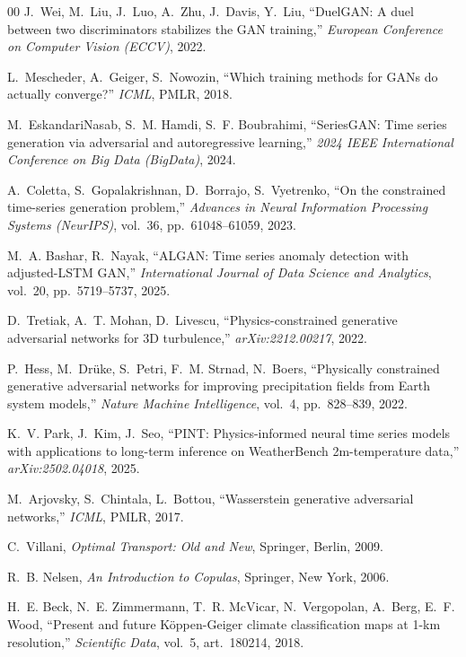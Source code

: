 \documentclass[preprint,12pt]{elsarticle}
\begin{document}
\begin{thebibliography}{00}
J.~Wei, M.~Liu, J.~Luo, A.~Zhu, J.~Davis, Y.~Liu,
``DuelGAN: A duel between two discriminators stabilizes the GAN training,''
\textit{European Conference on Computer Vision (ECCV)}, 2022.

L.~Mescheder, A.~Geiger, S.~Nowozin,
``Which training methods for GANs do actually converge?''
\textit{ICML}, PMLR, 2018.

M.~EskandariNasab, S.~M. Hamdi, S.~F. Boubrahimi,
``SeriesGAN: Time series generation via adversarial and autoregressive learning,''
\textit{2024 IEEE International Conference on Big Data (BigData)}, 2024.

A.~Coletta, S.~Gopalakrishnan, D.~Borrajo, S.~Vyetrenko,
``On the constrained time-series generation problem,''
\textit{Advances in Neural Information Processing Systems (NeurIPS)}, vol.~36, pp.~61048--61059, 2023.

M.~A. Bashar, R.~Nayak,
``ALGAN: Time series anomaly detection with adjusted-LSTM GAN,''
\textit{International Journal of Data Science and Analytics}, vol.~20, pp.~5719--5737, 2025.

D.~Tretiak, A.~T. Mohan, D.~Livescu,
``Physics-constrained generative adversarial networks for 3D turbulence,''
\textit{arXiv:2212.00217}, 2022.

P.~Hess, M.~Dr{\"u}ke, S.~Petri, F.~M. Strnad, N.~Boers,
``Physically constrained generative adversarial networks for improving precipitation fields from Earth system models,''
\textit{Nature Machine Intelligence}, vol.~4, pp.~828--839, 2022.

K.~V. Park, J.~Kim, J.~Seo,
``PINT: Physics-informed neural time series models with applications to long-term inference on WeatherBench 2m-temperature data,''
\textit{arXiv:2502.04018}, 2025.

M.~Arjovsky, S.~Chintala, L.~Bottou,
``Wasserstein generative adversarial networks,''
\textit{ICML}, PMLR, 2017.

C.~Villani,
\textit{Optimal Transport: Old and New},
Springer, Berlin, 2009.

R.~B. Nelsen,
\textit{An Introduction to Copulas},
Springer, New York, 2006.

H.~E. Beck, N.~E. Zimmermann, T.~R. McVicar, N.~Vergopolan, A.~Berg, E.~F. Wood,
``Present and future K\"{o}ppen-Geiger climate classification maps at 1-km resolution,''
\textit{Scientific Data}, vol.~5, art.~180214, 2018.

\end{thebibliography}
\end{document}
